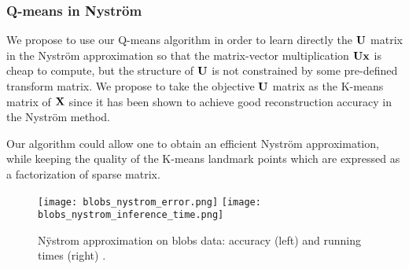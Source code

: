 \subsubsection{Q-means in Nyström}

We propose to use our Q-means algorithm in order to learn directly the ${\mathbf{U}}$ matrix in the Nyström approximation so that the matrix-vector multiplication ${\mathbf{U}} {\mathbf{x}}$ is cheap to compute, but the structure of ${\mathbf{U}}$ is not constrained by some pre-defined transform matrix. We propose to take the objective ${\mathbf{U}}$ matrix as the K-means matrix of ${\mathbf{X}}$ since it has been shown to achieve good reconstruction accuracy in the Nyström method.


Our algorithm could allow one to obtain an efficient Nyström approximation, while keeping the quality of the K-means landmark points which are expressed as a factorization of sparse matrix.  

\begin{figure}[tbh]
\centering
\texttt{[image: blobs\_nystrom\_error.png]}
\texttt{[image: blobs\_nystrom\_inference\_time.png]}

\caption{N\"ystrom approximation on blobs data: accuracy (left) and running times (right) .}
\label{fig:nystrom:blobs}
\end{figure}




